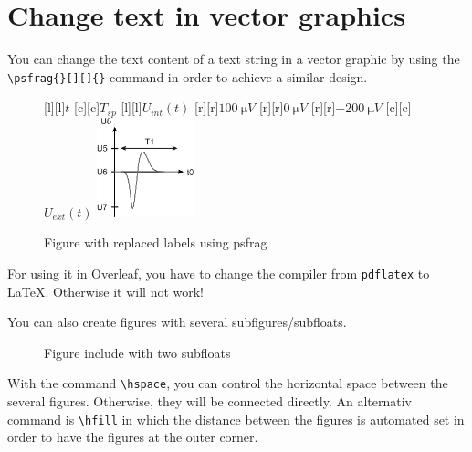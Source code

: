 \section{Change text in vector graphics}
You can change the text content of a text string in a vector graphic by using the \verb+\psfrag{}[][]{}+ command in order to achieve a similar design.
\begin{figure}[ht]  \centering
    [l][l]{$t$}
    [c][c]{$T_{sp}$}
    [l][l]{$U_{int}(t)$}
    [r][r]{$\SI{100}{\micro V}$}
    [r][r]{$\SI{0}{\micro V}$}
    [r][r]{$\SI{-200}{\micro V}$}
    [c][c]{$U_{ext}(t)$}
    \includegraphics[width=0.25\textwidth]{figures/example.eps}
    \label{fig:TutorialNeuron1}
    \caption{Figure with replaced labels using psfrag}
\end{figure}
For using it in Overleaf, you have to change the compiler from \verb+pdflatex+ to LaTeX. Otherwise it will not work!

You can also create figures with several subfigures/subfloats.
\begin{figure}[ht]    \centering
     \hspace{5mm}
    \caption{Figure include with two subfloats}
    \label{fig:TutorialNeuron2}
\end{figure}
With the command \verb+\hspace+, you can control the horizontal space between the several figures. Otherwise, they will be connected directly. An alternativ command is \verb+\hfill+ in which the distance between the figures is automated set in order to have the figures at the outer corner. 
\newpage

